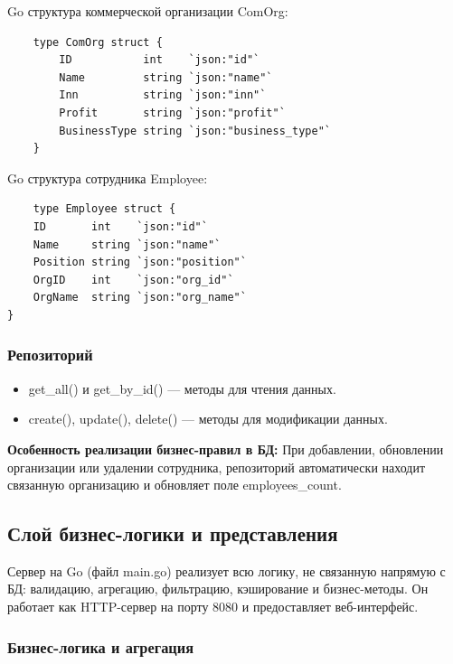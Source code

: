 \documentclass[oneside,a4paper,14pt]{extarticle}
\begin{document}
Go структура коммерческой организации ComOrg:
\begin{small}

\begin{verbatim}
    type ComOrg struct {
    	ID           int    `json:"id"`
    	Name         string `json:"name"`
    	Inn          string `json:"inn"`
    	Profit       string `json:"profit"`
    	BusinessType string `json:"business_type"`
    }
\end{verbatim}
\end{small}


Go структура сотрудника Employee:
\begin{verbatim}
    type Employee struct {
	ID       int    `json:"id"`
	Name     string `json:"name"`
	Position string `json:"position"`
	OrgID    int    `json:"org_id"`
	OrgName  string `json:"org_name"`
}
\end{verbatim}
\subsubsection*{Репозиторий}
\begin{itemize}
    \item get\_all() и get\_by\_id() — методы для чтения данных.
    \item create(), update(), delete() — методы для модификации данных.
\end{itemize}
\textbf{Особенность реализации бизнес-правил в БД:} При добавлении, обновлении организации или удалении сотрудника, репозиторий автоматически находит связанную организацию и обновляет поле employees\_count.

\subsection*{Слой бизнес-логики и представления}

Сервер на Go (файл main.go) реализует всю логику, не связанную напрямую с БД: валидацию, агрегацию, фильтрацию, кэширование и бизнес-методы. Он работает как HTTP-сервер на порту 8080 и предоставляет веб-интерфейс.

\subsubsection*{Бизнес-логика и агрегация}
\end{document}
